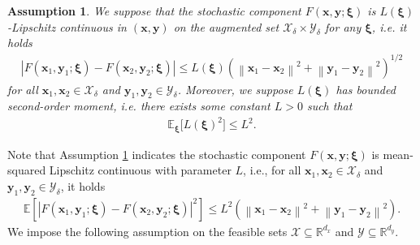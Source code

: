 \documentclass[11pt]{article}
\def\vx{\mathbf{x}}
\def\vy{\mathbf{y}}
\def\vxi{\bm{\xi}}
\def\fX{{\mathcal{X}}}
\def\fY{{\mathcal{Y}}}
\def\BE{{\mathbb{E}}}
\def\BR{{\mathbb{R}}}
\newcommand{\norm}[1]{\left\| #1 \right\|}
\newtheorem{assumption}{Assumption}
\begin{document}
\begin{assumption}\label{asm:Lipschitz}
We suppose that the stochastic component $F(\vx,\vy;\vxi)$ is $L(\vxi)$-Lipschitz continuous in $(\vx,\vy)$ on the augmented  set $\fX_\delta\times\fY_\delta$ for any $\vxi$, i.e. it holds 
\begin{align*}
|F(\vx_1,\vy_1;\vxi) - F(\vx_2,\vy_2;\vxi)| \le L(\vxi) \left(\norm{\vx_1 - \vx_2}^2 + \norm{\vy_1 - \vy_2}^2\right)^{1/2} 
\end{align*}
for all $\vx_1, \vx_2\in\fX_\delta$ and $\vy_1, \vy_2\in\fY_\delta$.
Moreover, we suppose $L(\vxi)$ has bounded second-order moment, i.e. there exists some constant $L>0$ such that 
\begin{align*}
\BE_{\vxi} \big[L(\vxi)^2\big] \le L^2.    
\end{align*}
\end{assumption}
Note that Assumption \ref{asm:Lipschitz} indicates the stochastic component $F(\vx,\vy;\vxi)$ is mean-squared Lipschitz continuous with parameter $L$, i.e.,
for all $\vx_1, \vx_2\in\fX_\delta$ and $\vy_1, \vy_2\in\fY_\delta$, it holds 
\begin{align*}
\mathbb{E}\left[|F(\vx_1,\vy_1;\vxi) - F(\vx_2,\vy_2;\vxi)|^2\right] \leq L^2\left(\norm{\vx_1 - \vx_2}^2 + \norm{\vy_1 - \vy_2}^2\right).    
\end{align*}
We impose the following assumption on the feasible sets $\fX\subseteq\BR^{d_x}$ and $\fY\subseteq\BR^{d_y}$.
\end{document}
